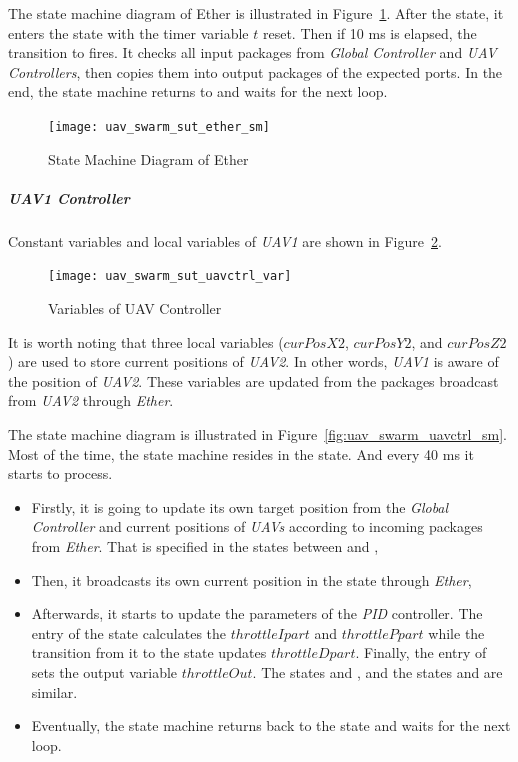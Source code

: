 The state machine diagram of Ether is illustrated in Figure~\ref{fig:uav_swarm_sut_ether_sm}. After the  state, it enters the  state with the timer variable $t$ reset. Then if 10 ms is elapsed, the transition to  fires. It checks all input packages from \emph{Global Controller} and \emph{UAV Controllers}, then copies them into output packages of the expected ports. In the end, the state machine returns to  and waits for the next loop.
\begin{figure}[htb!]
    \centering
	\texttt{[image: uav\_swarm\_sut\_ether\_sm]}
    \caption{State Machine Diagram of Ether}
    \label{fig:uav_swarm_sut_ether_sm}
\end{figure}

\subparagraph{\emph{UAV1 Controller}}
{Constant variables and local variables} of \emph{UAV1} are shown in Figure~\ref{fig:uav_swarm_uavctrl_var}.

\begin{figure}[htb!]
    \centering
	\texttt{[image: uav\_swarm\_sut\_uavctrl\_var]}
    \caption{Variables of UAV Controller}
    \label{fig:uav_swarm_uavctrl_var}
\end{figure}

It is worth noting that three local variables ($curPosX2$, $curPosY2$, and $curPosZ2$) are used to store current positions of \emph{UAV2}. In other words, \emph{UAV1} is aware of the position of \emph{UAV2}. These variables are updated from the packages broadcast from \emph{UAV2} through \emph{Ether}.

The state machine diagram is illustrated in Figure~\ref{fig:uav_swarm_uavctrl_sm}. Most of the time, the state machine resides in the  state. And every 40 ms it starts to process.
\begin{itemize}
    \item Firstly, it is going to update its own target position from the \emph{Global Controller} and current positions of \emph{UAVs} according to incoming packages from \emph{Ether}. That is specified in the states between  and ,
    \item Then, it broadcasts its own current position in the  state through \emph{Ether},
    \item Afterwards, it starts to update the parameters of the \emph{PID} controller. The entry of the state  calculates the $throttleIpart$ and $throttlePpart$ while the transition from it to the state  updates $throttleDpart$. Finally, the entry of  sets the output variable $throttleOut$. The states  and , and the states  and  are similar.
    \item Eventually, the state machine returns back to the  state and waits for the next loop.
\end{itemize}


